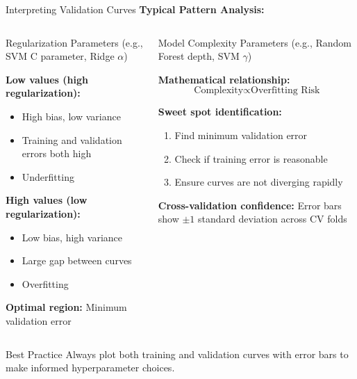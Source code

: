 \documentclass[8pt,aspectratio=1610]{beamer}
\begin{document}
\begin{frame}{Interpreting Validation Curves}
\textbf{Typical Pattern Analysis:}

\begin{columns}[t]
\begin{column}{0.48\textwidth}
\begin{block}{Regularization Parameters}
(e.g., SVM C parameter, Ridge $\alpha$)

\textbf{Low values (high regularization):}
\begin{itemize}
\item High bias, low variance
\item Training and validation errors both high
\item Underfitting
\end{itemize}

\textbf{High values (low regularization):}
\begin{itemize}
\item Low bias, high variance
\item Large gap between curves
\item Overfitting
\end{itemize}

\textbf{Optimal region:} Minimum validation error
\end{block}
\end{column}

\begin{column}{0.48\textwidth}
\begin{block}{Model Complexity Parameters}
(e.g., Random Forest depth, SVM $\gamma$)

\textbf{Mathematical relationship:}
$$\text{Complexity} \propto \text{Overfitting Risk}$$

\textbf{Sweet spot identification:}
\begin{enumerate}
\item Find minimum validation error
\item Check if training error is reasonable
\item Ensure curves are not diverging rapidly
\end{enumerate}

\textbf{Cross-validation confidence:}
Error bars show $\pm 1$ standard deviation across CV folds
\end{block}
\end{column}
\end{columns}

\begin{alertblock}{Best Practice}
Always plot both training and validation curves with error bars to make informed hyperparameter choices.
\end{alertblock}
\end{frame}
\end{document}

